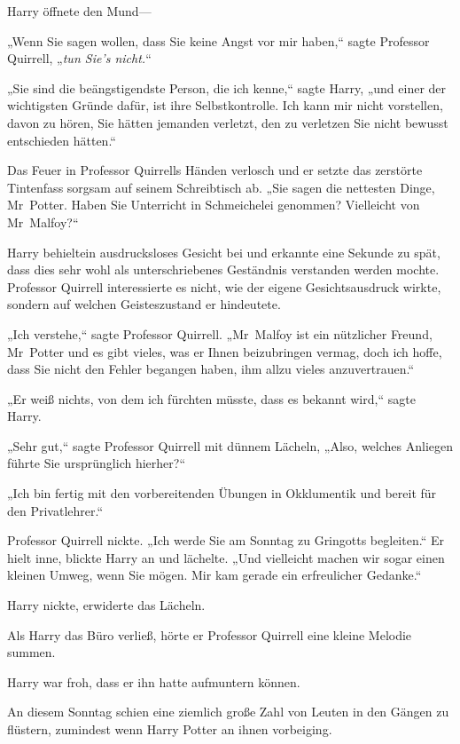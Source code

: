 {Harry öffnete den Mund—

„Wenn Sie sagen wollen, dass Sie keine Angst vor mir haben,“ sagte Professor Quirrell, „\emph{tun Sie's nicht.}“

„Sie sind die beängstigendste Person, die ich kenne,“ sagte Harry, „und einer der wichtigsten Gründe dafür, ist ihre Selbstkontrolle. Ich kann mir nicht vorstellen, davon zu hören, Sie hätten jemanden verletzt, den zu verletzen Sie nicht bewusst entschieden hätten.“

Das Feuer in Professor Quirrells Händen verlosch und er setzte das zerstörte Tintenfass sorgsam auf seinem Schreibtisch ab. „Sie sagen die nettesten Dinge, Mr~Potter. Haben Sie Unterricht in Schmeichelei genommen? Vielleicht von Mr~Malfoy?“

Harry behieltein ausdrucksloses Gesicht bei und erkannte eine Sekunde zu spät, dass dies sehr wohl als unterschriebenes Geständnis verstanden werden mochte. Professor Quirrell interessierte es nicht, wie der eigene Gesichtsausdruck wirkte, sondern auf welchen Geisteszustand er hindeutete.

„Ich verstehe,“ sagte Professor Quirrell. „Mr~Malfoy ist ein nützlicher Freund, Mr~Potter und es gibt vieles, was er Ihnen beizubringen vermag, doch ich hoffe, dass Sie nicht den Fehler begangen haben, ihm allzu vieles anzuvertrauen.“

„Er weiß nichts, von dem ich fürchten müsste, dass es bekannt wird,“ sagte Harry.

„Sehr gut,“ sagte Professor Quirrell mit dünnem Lächeln, „Also, welches Anliegen führte Sie ursprünglich hierher?“

„Ich bin fertig mit den vorbereitenden Übungen in Okklumentik und bereit für den Privatlehrer.“

Professor Quirrell nickte. „Ich werde Sie am Sonntag zu Gringotts begleiten.“ Er hielt inne, blickte Harry an und lächelte. „Und vielleicht machen wir sogar einen kleinen Umweg, wenn Sie mögen. Mir kam gerade ein erfreulicher Gedanke.“

Harry nickte, erwiderte das Lächeln.

Als Harry das Büro verließ, hörte er Professor Quirrell eine kleine Melodie summen.

Harry war froh, dass er ihn hatte aufmuntern können.

\later

An diesem Sonntag schien eine ziemlich große Zahl von Leuten in den Gängen zu flüstern, zumindest wenn Harry Potter an ihnen vorbeiging.

}
